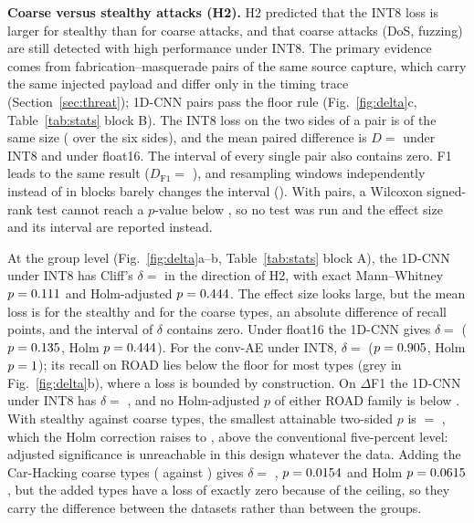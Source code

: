 \textbf{Coarse versus stealthy attacks (H2).} H2 predicted that the INT8 loss is larger for stealthy than for coarse
attacks, and that coarse attacks (DoS, fuzzing) are still detected with high performance under INT8. The primary
evidence comes from fabrication--masquerade pairs of the same source capture, which carry the same injected payload
and differ only in the timing trace (Section~\ref{sec:threat}); \NPairUnits{} 1D-CNN pairs pass the floor rule
(Fig.~\ref{fig:delta}c, Table~\ref{tab:stats} block B). The INT8 loss on the two sides of a pair is of the same size
(\PairSideRange{} over the six sides), and the mean paired difference is
$D =$ \DRQTwoCI{} under INT8 and \DRQOneCI{} under float16. The interval of every single pair also contains zero. F1
leads to the same result ($D_{\mathrm{F1}} =$ \DFQTwoCI), and resampling windows independently instead of in blocks
barely changes the interval (\DRQTwoIid). With \NPairUnits{} pairs, a Wilcoxon signed-rank test cannot reach a
$p$-value below \PairMinP, so no test was run and the effect size and its interval are reported instead.

At the group level (Fig.~\ref{fig:delta}a--b, Table~\ref{tab:stats} block A), the 1D-CNN under INT8 has Cliff's
$\delta =$ \GroupCNNQTwoCI{} in the direction of H2, with exact Mann--Whitney $p = 0.111$ and Holm-adjusted
$p = 0.444$. The effect size looks large, but the mean loss is \GroupMeanStealthy{} for the stealthy and
\GroupMeanCoarse{} for the coarse types, an absolute difference of \GroupDiffPts{} recall points, and the interval of
$\delta$ contains zero. Under float16 the 1D-CNN gives $\delta =$ \GroupCNNQOneCI{} ($p = 0.135$, Holm
$p = 0.444$). For the conv-AE under INT8, $\delta =$ \GroupAEQTwoCI{} ($p = 0.905$, Holm
$p = 1$); its recall on ROAD lies below the floor for most types (grey in Fig.~\ref{fig:delta}b), where
a loss is bounded by construction. On $\Delta$F1 the 1D-CNN under INT8 has $\delta =$ \GroupCNNQTwoFCI, and no
Holm-adjusted $p$ of either ROAD family is below \GroupMinHolm. With \GroupStealthy{} stealthy against \GroupCoarse{}
coarse types, the smallest attainable two-sided $p$ is \GroupMinPFrac{} $=$ \GroupMinP, which the Holm correction
raises to \GroupMinPHolm, above the conventional five-percent level: adjusted significance is unreachable in this
design whatever the data. Adding the Car-Hacking coarse types (\GroupStealthy{} against \SensCoarse) gives
$\delta =$ \SensCNNQTwoCI, $p = 0.0154$ and Holm $p = 0.0615$, but the added types have a loss of
exactly zero because of the ceiling, so they carry the difference between the datasets rather than between the groups.

